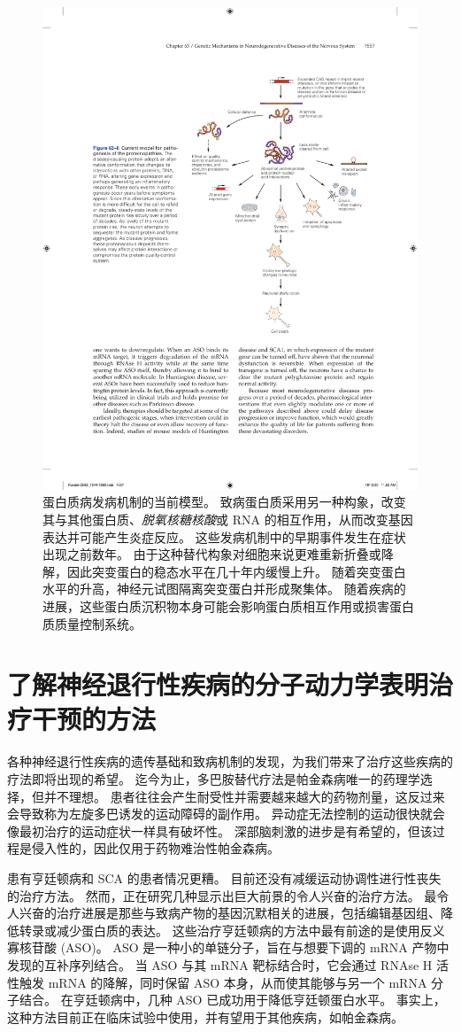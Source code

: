 \begin{figure}[htbp]
	\centering
	\includegraphics[width=0.7\linewidth]{chap63/fig_63_6}
	\caption{蛋白质病发病机制的当前模型。 致病蛋白质采用另一种构象，改变其与其他蛋白质、\textit{脱氧核糖核酸}或 RNA 的相互作用，从而改变基因表达并可能产生炎症反应。 这些发病机制中的早期事件发生在症状出现之前数年。 由于这种替代构象对细胞来说更难重新折叠或降解，因此突变蛋白的稳态水平在几十年内缓慢上升。 随着突变蛋白水平的升高，神经元试图隔离突变蛋白并形成聚集体。 随着疾病的进展，这些蛋白质沉积物本身可能会影响蛋白质相互作用或损害蛋白质质量控制系统。}
	\label{fig:63_6}
\end{figure}



\section{了解神经退行性疾病的分子动力学表明治疗干预的方法}

各种神经退行性疾病的遗传基础和致病机制的发现，为我们带来了治疗这些疾病的疗法即将出现的希望。
迄今为止，多巴胺替代疗法是帕金森病唯一的药理学选择，但并不理想。
患者往往会产生耐受性并需要越来越大的药物剂量，这反过来会导致称为左旋多巴诱发的运动障碍的副作用。
异动症无法控制的运动很快就会像最初治疗的运动症状一样具有破坏性。
深部脑刺激的进步是有希望的，但该过程是侵入性的，因此仅用于药物难治性帕金森病。


患有亨廷顿病和 SCA 的患者情况更糟。
目前还没有减缓运动协调性进行性丧失的治疗方法。
然而，正在研究几种显示出巨大前景的令人兴奋的治疗方法。
最令人兴奋的治疗进展是那些与致病产物的基因沉默相关的进展，包括编辑基因组、降低转录或减少蛋白质的表达。
这些治疗亨廷顿病的方法中最有前途的是使用反义寡核苷酸 (ASO)。
ASO 是一种小的单链分子，旨在与想要下调的 mRNA 产物中发现的互补序列结合。
当 ASO 与其 mRNA 靶标结合时，它会通过 RNAse H 活性触发 mRNA 的降解，同时保留 ASO 本身，从而使其能够与另一个 mRNA 分子结合。
在亨廷顿病中，几种 ASO 已成功用于降低亨廷顿蛋白水平。
事实上，这种方法目前正在临床试验中使用，并有望用于其他疾病，如帕金森病。


